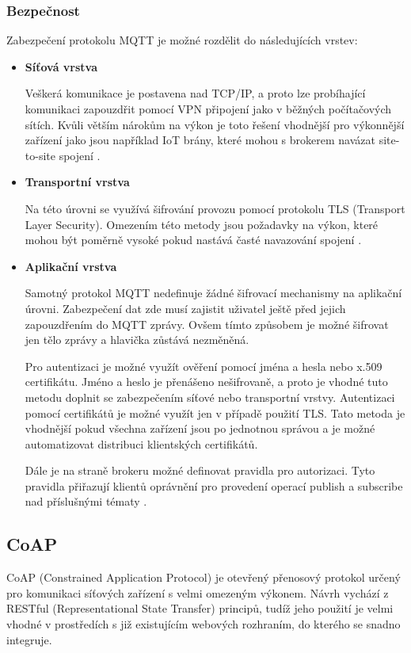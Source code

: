  \subsubsection{Bezpečnost}
 Zabezpečení protokolu MQTT je možné rozdělit do následujících vrstev:
 \begin{itemize}
  \item \textbf{Síťová vrstva}
  
    Veškerá komunikace je postavena nad TCP/IP, a proto lze probíhající komunikaci
    zapouzdřit pomocí VPN připojení
    jako v běžných počítačových sítích. Kvůli větším nárokům na výkon je toto
    řešení vhodnější pro výkonnější zařízení jako jsou například IoT brány, které
    mohou s brokerem navázat site-to-site spojení \cite{mqtt_sec}.
    
  \item \textbf{Transportní vrstva}
  
  Na této úrovni se využívá šifrování provozu pomocí protokolu TLS (Transport
  Layer Security). Omezením této metody jsou požadavky na výkon, které mohou být
  poměrně vysoké pokud nastává časté navazování spojení \cite{mqtt_sec}.
  
  \item \textbf{Aplikační vrstva}
  
  Samotný protokol MQTT nedefinuje žádné šifrovací mechanismy na aplikační úrovni. 
  Zabezpečení dat zde musí zajistit uživatel ještě před jejich zapouzdřením do MQTT zprávy. 
  Ovšem tímto způsobem je možné šifrovat jen tělo zprávy a hlavička zůstává nezměněná.
  
  Pro autentizaci je možné využít ověření pomocí jména a hesla nebo x.509 certifikátu.
  Jméno a heslo je přenášeno nešifrovaně, a proto je vhodné tuto metodu doplnit se 
  zabezpečením síťové nebo transportní vrstvy. Autentizaci pomocí certifikátů 
  je možné využít jen v případě použití TLS. Tato metoda je vhodnější pokud všechna
  zařízení jsou po jednotnou správou a je možné automatizovat distribuci 
  klientských certifikátů.
  
  Dále je na straně brokeru možné definovat pravidla pro autorizaci. Tyto pravidla 
  přiřazují klientů oprávnění pro provedení operací publish a subscribe
  nad příslušnými tématy \cite{mqtt_sec}.
  
 \end{itemize}

  \subsection{CoAP}
  CoAP (Constrained Application Protocol) je otevřený přenosový protokol určený pro
  komunikaci síťových zařízení s velmi omezeným výkonem. Návrh vychází z RESTful
  (Representational State Transfer) principů, tudíž jeho použití je velmi vhodné
  v prostředích s již existujícím webových rozhraním, do kterého se snadno integruje. \cite{coap}
  
